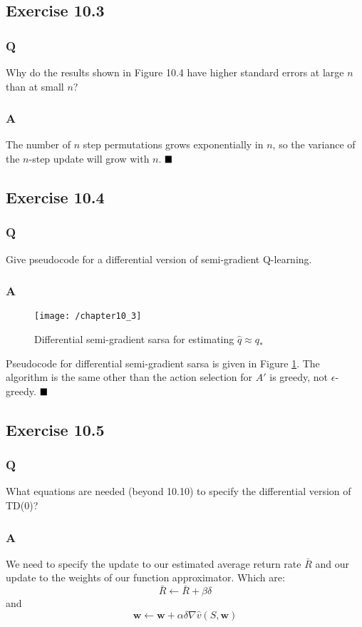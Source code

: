 \subsection{Exercise 10.3}
\subsubsection{Q}
Why do the results shown in Figure 10.4 have higher standard errors at large $n$ than at small $n$?
\subsubsection{A}
The number of $n$ step permutations grows exponentially in $n$, so the variance of the $n$-step update will grow with $n$.
$
\hfill \blacksquare
$

\subsection{Exercise 10.4}
\subsubsection{Q}
Give pseudocode for a differential version of semi-gradient Q-learning.
\subsubsection{A}
\begin{figure}[h!]
	\centering
	\texttt{[image: /chapter10\_3]}
	\caption{Differential semi-gradient sarsa for estimating $\hat{q} \approx q_*$}
	\label{fig: 10_3}
\end{figure}
Pseudocode for differential semi-gradient sarsa is given in Figure \ref{fig: 10_3}. The algorithm is the same other than the action selection for $A'$ is greedy, not $\epsilon$-greedy.
$
\hfill \blacksquare
$

\subsection{Exercise 10.5}
\subsubsection{Q}
What equations are needed (beyond 10.10) to specify the differential version of TD(0)?
\subsubsection{A}
We need to specify the update to our estimated average return rate $\bar{R}$ and our update to the weights of our function approximator. Which are:
\begin{equation}
\bar{R} \leftarrow \bar{R} + \beta\delta
\end{equation}
and
\begin{equation}
\textbf{w} \leftarrow \textbf{w} + \alpha \delta \nabla \hat{v}(S, \textbf{w})
\end{equation}

